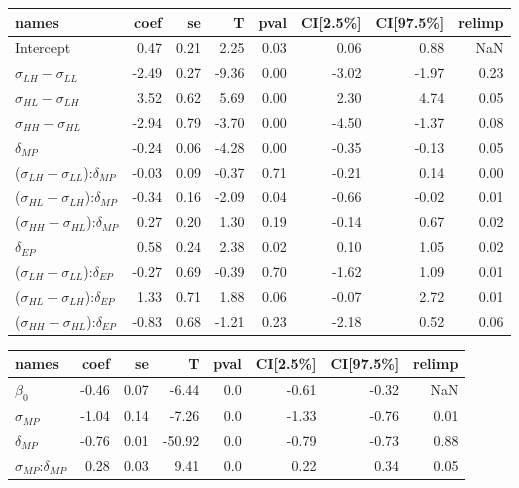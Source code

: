 \begin{tabular}{lrrrrrrr}
\toprule
                                      names &  coef &   se &     T &  pval &  CI[2.5\%] &  CI[97.5\%] &  relimp \\
\midrule
                                  Intercept &  0.47 & 0.21 &  2.25 &  0.03 &       0.06 &        0.88 &     NaN \\
                $\sigma_{LH} - \sigma_{LL}$ & -2.49 & 0.27 & -9.36 &  0.00 &      -3.02 &       -1.97 &    0.23 \\
                $\sigma_{HL} - \sigma_{LH}$ &  3.52 & 0.62 &  5.69 &  0.00 &       2.30 &        4.74 &    0.05 \\
                $\sigma_{HH} - \sigma_{HL}$ & -2.94 & 0.79 & -3.70 &  0.00 &      -4.50 &       -1.37 &    0.08 \\
                              $\delta_{MP}$ & -0.24 & 0.06 & -4.28 &  0.00 &      -0.35 &       -0.13 &    0.05 \\
($\sigma_{LH} - \sigma_{LL}$):$\delta_{MP}$ & -0.03 & 0.09 & -0.37 &  0.71 &      -0.21 &        0.14 &    0.00 \\
($\sigma_{HL} - \sigma_{LH}$):$\delta_{MP}$ & -0.34 & 0.16 & -2.09 &  0.04 &      -0.66 &       -0.02 &    0.01 \\
($\sigma_{HH} - \sigma_{HL}$):$\delta_{MP}$ &  0.27 & 0.20 &  1.30 &  0.19 &      -0.14 &        0.67 &    0.02 \\
                              $\delta_{EP}$ &  0.58 & 0.24 &  2.38 &  0.02 &       0.10 &        1.05 &    0.02 \\
($\sigma_{LH} - \sigma_{LL}$):$\delta_{EP}$ & -0.27 & 0.69 & -0.39 &  0.70 &      -1.62 &        1.09 &    0.01 \\
($\sigma_{HL} - \sigma_{LH}$):$\delta_{EP}$ &  1.33 & 0.71 &  1.88 &  0.06 &      -0.07 &        2.72 &    0.01 \\
($\sigma_{HH} - \sigma_{HL}$):$\delta_{EP}$ & -0.83 & 0.68 & -1.21 &  0.23 &      -2.18 &        0.52 &    0.06 \\
\bottomrule
\end{tabular}


\begin{tabular}{lrrrrrrr}
\toprule
                      names &  coef &   se &      T &  pval &  CI[2.5\%] &  CI[97.5\%] &  relimp \\
\midrule
                $\beta_{0}$ & -0.46 & 0.07 &  -6.44 &   0.0 &      -0.61 &       -0.32 &     NaN \\
              $\sigma_{MP}$ & -1.04 & 0.14 &  -7.26 &   0.0 &      -1.33 &       -0.76 &    0.01 \\
              $\delta_{MP}$ & -0.76 & 0.01 & -50.92 &   0.0 &      -0.79 &       -0.73 &    0.88 \\
$\sigma_{MP}$:$\delta_{MP}$ &  0.28 & 0.03 &   9.41 &   0.0 &       0.22 &        0.34 &    0.05 \\
\bottomrule
\end{tabular}
